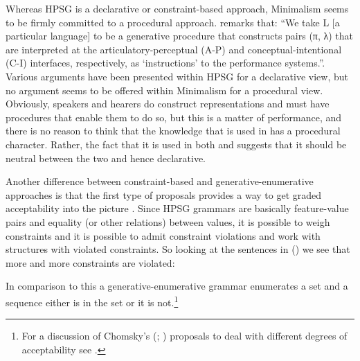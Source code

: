 \documentclass[output=paper]{langsci/langscibook}
\begin{document}
Whereas HPSG is a declarative or constraint-based approach, Minimalism seems to be firmly committed
to a procedural approach. \citet[219]{Chomsky95a-u} remarks that: ``We take L [a particular language]
to be a generative procedure that constructs pairs (π, λ) that are interpreted at the
articulatory-perceptual (A-P) and conceptual-intentional (C-I) interfaces, respectively, as
`instructions' to the performance systems.''. Various arguments have been presented within HPSG for
a declarative view, but no argument seems to be offered within Minimalism for a procedural
view. Obviously, speakers and hearers do construct representations and must have procedures that
enable them to do so, but this is a matter of performance, and there is no reason to think that the
knowledge that is used in  has a procedural character. Rather, the fact that it is used in
both  and  suggests that it should be neutral between the two and hence
declarative. 

Another difference between constraint-based and generative-enumerative approaches is that the first
type of proposals provides a way to get graded acceptability into the picture \citep[Section~3.1]{PS2001a}. Since HPSG grammars
are basically feature-value pairs and equality (or other relations) between values, it is possible
to weigh constraints and it is possible to admit constraint violations and work with structures with
violated constraints. So looking at the sentences in () we see that more and more constraints
are violated:
\eal
{}
\zl

\noindent
In comparison to this a generative-enumerative grammar enumerates a set and a
sequence either is in the set or it is not.\footnote{%
For a discussion of Chomsky's
(\citeyear{Chomsky64a}; \citeyear[Chapter~5]{Chomsky75a}) proposals to deal with different degrees
of acceptability see .
}

\end{document}
